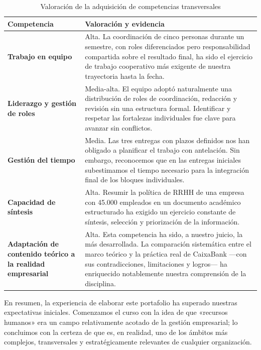 \begin{table}[H]
  \centering
  \small
  \caption{Valoración de la adquisición de competencias transversales}
  \begin{tabularx}{\textwidth}{p{} X}
    \toprule
    \textbf{Competencia}                         & \textbf{Valoración y evidencia} \\
    \midrule
    \textbf{Trabajo en equipo}
    & Alta. La coordinación de cinco personas durante un semestre,
      con roles diferenciados pero responsabilidad compartida sobre
      el resultado final, ha sido el ejercicio de trabajo cooperativo
      más exigente de nuestra trayectoria hasta la fecha. \\
    \addlinespace
    \textbf{Liderazgo y gestión de roles}
    & Media-alta. El equipo adoptó naturalmente una distribución de
      roles de coordinación, redacción y revisión sin una estructura
      formal. Identificar y respetar las fortalezas individuales fue
      clave para avanzar sin conflictos. \\
    \addlinespace
    \textbf{Gestión del tiempo}
    & Media. Las tres entregas con plazos definidos nos han obligado a
      planificar el trabajo con antelación. Sin embargo, reconocemos que
      en las entregas iniciales subestimamos el tiempo necesario para la
      integración final de los bloques individuales. \\
    \addlinespace
    \textbf{Capacidad de síntesis}
    & Alta. Resumir la política de RRHH de una empresa con 45.000 empleados
      en un documento académico estructurado ha exigido un ejercicio
      constante de síntesis, selección y priorización de la información. \\
    \addlinespace
    \textbf{Adaptación de contenido teórico a la realidad empresarial}
    & Alta. Esta competencia ha sido, a nuestro juicio, la más desarrollada.
      La comparación sistemática entre el marco teórico y la práctica real
      de CaixaBank —con sus contradicciones, limitaciones y logros— ha
      enriquecido notablemente nuestra comprensión de la disciplina. \\
    \bottomrule
  \end{tabularx}
\end{table}

\medskip

En resumen, la experiencia de elaborar este portafolio ha superado nuestras
expectativas iniciales. Comenzamos el curso con la idea de que «recursos humanos»
era un campo relativamente acotado de la gestión empresarial; lo concluimos con
la certeza de que es, en realidad, uno de los ámbitos más complejos, transversales
y estratégicamente relevantes de cualquier organización.

\endinput
